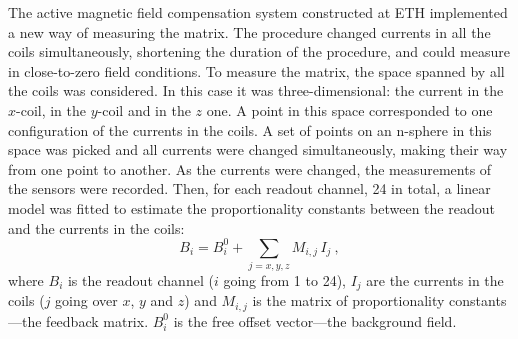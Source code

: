 The active magnetic field compensation system constructed at ETH implemented a new way of measuring the matrix. The procedure changed currents in all the coils simultaneously, shortening the duration of the procedure, and could measure in close-to-zero field conditions. To measure the matrix, the space spanned by all the coils was considered. In this case it was three-dimensional: the current in the $x$-coil, in the $y$-coil and in the $z$ one. A point in this space corresponded to one configuration of the currents in the coils. A set of points on an n-sphere in this space was picked and all currents were changed simultaneously, making their way from one point to another. As the currents were changed, the measurements of the sensors were recorded. Then, for each readout channel, 24 in total, a linear model was fitted to estimate the proportionality constants between the readout and the currents in the coils:
\begin{equation}
  \label{eq:SFC_matrix_linear_fits}
  B_i = B_i^0 + \sum_{j=x,y,z} M_{i,j} \, I_j \ ,
\end{equation}
where $B_i$ is the readout channel ($i$ going from 1 to 24), $I_j$ are the currents in the coils ($j$ going over $x$, $y$ and $z$) and $M_{i,j}$ is the matrix of proportionality constants---the feedback matrix. $B_i^0$ is the free offset vector---the background field.

